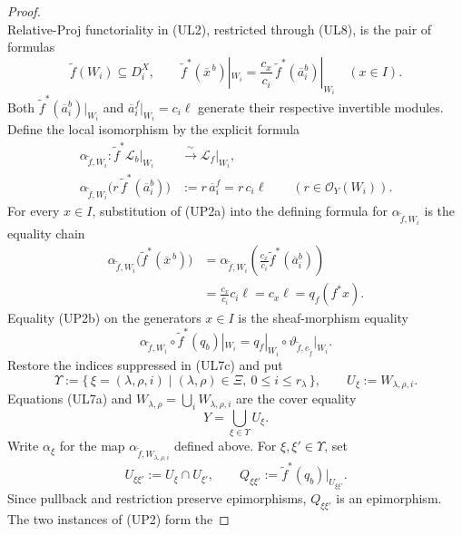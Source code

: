 \begin{proof}
\[  \]
  Relative-Proj functoriality in (UL2), restricted through (UL8), is the
  pair of formulas
  \[
    \widetilde f(W_i)\subseteq D_i^X,\qquad
    \widetilde f^*(\overline x^{\,b})|_{W_i}
      =\frac{c_x}{c_i}\,
        \widetilde f^*(\overline a_i^b)|_{W_i}
      \quad(x\in I).                                      \tag{UP2a}
      \label{eq:nagata-universal-lift-chart}
  \]
  Both $\widetilde f^*(\overline a_i^b)|_{W_i}$ and
  $\overline a_i^f|_{W_i}=c_i\ell$ generate their respective invertible
  modules.  Define the local isomorphism by the explicit formula
  \[
  \begin{aligned}
    \alpha_{\widetilde f,W_i}\colon
      \widetilde f^*\mathcal L_b|_{W_i}
      &\xrightarrow{\ \sim\ }\mathcal L_f|_{W_i},\\
    \alpha_{\widetilde f,W_i}
      \bigl(r\,\widetilde f^*(\overline a_i^b)\bigr)
      &:=r\,\overline a_i^f=r\,c_i\ell
      \qquad(r\in\mathcal O_Y(W_i)).
  \end{aligned}
  \]
  For every $x\in I$, substitution of (UP2a) into the defining formula for
  $\alpha_{\widetilde f,W_i}$ is the equality chain
  \[
  \begin{aligned}
    \alpha_{\widetilde f,W_i}
      \bigl(\widetilde f^*(\overline x^{\,b})\bigr)
      &=\alpha_{\widetilde f,W_i}
        \left(\frac{c_x}{c_i}\widetilde f^*(\overline a_i^b)\right)\\
      &=\frac{c_x}{c_i}c_i\ell
       =c_x\ell=q_f(f^*x).
  \end{aligned}                                             \tag{UP2b}
  \]
  Equality (UP2b) on the generators $x\in I$ is the sheaf-morphism equality
  \[
    \alpha_{\widetilde f,W_i}\circ
      \widetilde f^*(q_b)|_{W_i}
      =q_f|_{W_i}\circ
        \vartheta_{\widetilde f,e_{\widetilde f}}|_{W_i}.     \tag{UP2}
  \]
  Restore the indices suppressed in (UL7c) and put
  \[
    \Upsilon:=
      \{\,\xi=(\lambda,\rho,i)\mid
        (\lambda,\rho)\in\Xi,\ 0\le i\le r_\lambda\,\},\qquad
    U_\xi:=W_{\lambda,\rho,i}.
  \]
  Equations (UL7a) and $W_{\lambda,\rho}=\bigcup_iW_{\lambda,\rho,i}$
  are the cover equality
  \[
    Y=\bigcup_{\xi\in\Upsilon}U_\xi.                           \tag{UL10}
  \]
  Write $\alpha_\xi$ for the map
  $\alpha_{\widetilde f,W_{\lambda,\rho,i}}$ defined above.  For
  $\xi,\xi'\in\Upsilon$, set
  \[
    U_{\xi\xi'}:=U_\xi\cap U_{\xi'},\qquad
    Q_{\xi\xi'}:=
      \widetilde f^*(q_b)|_{U_{\xi\xi'}}.
  \]
  Since pullback and restriction preserve epimorphisms,
  $Q_{\xi\xi'}$ is an epimorphism.  The two instances of (UP2) form the

\end{proof}
